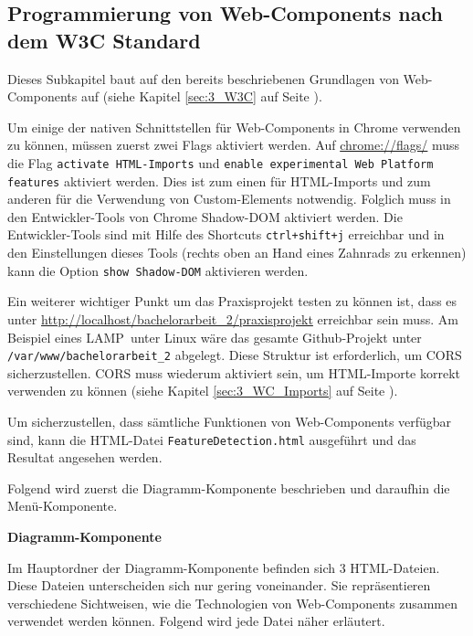 \subsection{Programmierung von Web-Components nach dem W3C Standard}
\label{sec:4_WC_Pur}

Dieses Subkapitel baut auf den bereits beschriebenen Grundlagen von Web-Components auf (siehe Kapitel \ref{sec:3_W3C} auf Seite \pageref{sec:3_W3C}).

Um einige der nativen Schnittstellen für Web-Components in Chrome verwenden zu können, müssen zuerst zwei Flags aktiviert werden. Auf \url{chrome://flags/} muss die Flag \lstinline|activate HTML-Imports| und \lstinline|enable experimental Web Platform features| aktiviert werden. Dies ist zum einen für HTML-Imports und zum anderen für die Verwendung von Custom-Elements notwendig. Folglich muss in den Entwickler-Tools von Chrome Shadow-DOM aktiviert werden. Die Entwickler-Tools sind mit Hilfe des Shortcuts \lstinline|ctrl+shift+j| erreichbar und in den Einstellungen dieses Tools (rechts oben an Hand eines Zahnrads zu erkennen) kann die Option \lstinline|show Shadow-DOM| aktivieren werden.

Ein weiterer wichtiger Punkt um das Praxisprojekt testen zu können ist, dass es unter \url{http://localhost/bachelorarbeit_2/praxisprojekt} erreichbar sein muss. Am Beispiel eines \glqq LAMP\grqq\ unter Linux wäre das gesamte Github-Projekt unter \lstinline|/var/www/bachelorarbeit_2| abgelegt. Diese Struktur ist erforderlich, um CORS sicherzustellen. CORS muss wiederum  aktiviert sein, um HTML-Importe korrekt verwenden zu können (siehe Kapitel \ref{sec:3_WC_Imports} auf Seite \pageref{sec:3_WC_Imports}).

Um sicherzustellen, dass sämtliche Funktionen von Web-Components verfügbar sind, kann die HTML-Datei \lstinline|FeatureDetection.html| ausgeführt und das Resultat angesehen werden.

Folgend wird zuerst die Diagramm-Komponente beschrieben und daraufhin die Menü-Komponente.

\textbf{Diagramm-Komponente}

Im Hauptordner der Diagramm-Komponente befinden sich 3 HTML-Dateien. Diese Dateien unterscheiden sich nur gering voneinander. Sie repräsentieren verschiedene Sichtweisen, wie die Technologien von Web-Components zusammen verwendet werden können. Folgend wird jede Datei näher erläutert.

